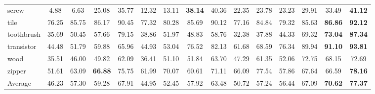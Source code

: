 \documentclass[letterpaper]{article} %
\begin{document}
\begin{table}[htbp]
{\begin{tabular}{l|cc|cc|cc|cc|cc|cc|cc}
screw & 4.88  & 6.63  & 25.08 & 35.77 &  12.32 & 13.11  &\textbf{38.14} & {40.36} & 22.35 & 23.78 & 23.23 & 29.91 & 33.49 &\textbf{41.12} \\
tile & 76.25 & 85.75 & 86.17 & 90.45 &  77.32 & 80.28  & 85.69 & 90.12 & 77.16 & 84.84 & 79.32 & 85.63 &\textbf{86.86} &\textbf{92.12} \\
toothbrush & 35.69 & 50.45 & 57.66 & 79.15 &  38.86 & 51.97  & 48.83 & 58.76 & 32.38 & 37.88 & 44.33 & 69.32 &\textbf{73.04} &\textbf{87.34} \\
transistor & 44.48 & 51.79 & 59.88 & 65.96 &  44.93 & 53.04  & 76.52 & 82.13 & 61.68 & 68.59 & 76.34 & {89.94} &\textbf{91.10} &\textbf{93.81} \\
wood & 35.51 & 46.00 & 49.82 & 62.09 &  36.41 & 51.10  & 51.84 & 63.70 & 47.29 & 61.35 & 52.06 & 72.75 & 68.15 & 72.69\\
zipper & 51.61 & 63.09 &\textbf{66.88} & 75.75 &   61.99 & 70.07   & 60.61 & 71.11 & 66.09 & 77.54 & 57.86 & 67.64 & 66.59 &\textbf{78.16} \\ \hline
Average
& 46.23 & 57.30
& 59.28 & 67.91
& 44.95 & 52.45
& 57.92 & 63.48
& 50.72 & 57.24
& 56.44 & 67.09
&\textbf{70.62} &\textbf{77.37} \\ \hline
\end{tabular}
}
\vskip 0.1in
\label{mvtec_bise}
\end{table}
\end{document}
